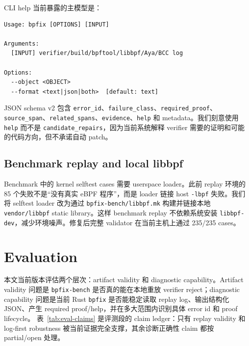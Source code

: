 \documentclass[letterpaper,twocolumn,10pt]{article}
\newcommand{\code}[1]{\texttt{#1}}
\begin{document}
CLI help 当前暴露的主模型是：
\begin{lstlisting}[style=tinycode]
Usage: bpfix [OPTIONS] [INPUT]

Arguments:
  [INPUT] verifier/build/bpftool/libbpf/Aya/BCC log

Options:
  --object <OBJECT>
  --format <text|json|both>  [default: text]
\end{lstlisting}

JSON schema v2 包含 \code{error\_id}、\code{failure\_class}、\code{required\_proof}、\code{source\_span}、\code{related\_spans}、\code{evidence}、\code{help} 和 metadata。我们刻意使用 \code{help} 而不是 \code{candidate\_repairs}，因为当前系统解释 verifier 需要的证明和可能的代码方向，但不承诺自动 patch。

\subsection{Benchmark replay and local libbpf}

Benchmark 中的 kernel selftest cases 需要 userspace loader。此前 replay 环境的 85 个失败不是“没有真实 eBPF 程序”，而是 loader 链接 host \code{-lbpf} 失败。我们将 selftest loader 改为通过 \code{bpfix-bench/libbpf.mk} 构建并链接本地 \code{vendor/libbpf} static library。这样 benchmark replay 不依赖系统安装 \code{libbpf-dev}，减少环境噪声。修复后完整 validator 在当前主机上通过 235/235 cases。

\section{Evaluation}
\label{sec:evaluation}

本文当前版本评估两个层次：artifact validity 和 diagnostic capability。Artifact validity 问题是 \code{bpfix-bench} 是否真的能在本地重放 verifier reject；diagnostic capability 问题是当前 Rust \code{bpfix} 是否能稳定读取 replay log、输出结构化 JSON、产生 required proof/help，并在多大范围内识别具体 error id 和 proof lifecycle。
表~\ref{tab:eval-claims} 是评测段的 claim ledger：只有 replay validity 和 log-first robustness 被当前证据完全支撑，其余诊断正确性 claim 都按 partial/open 处理。
\end{document}
